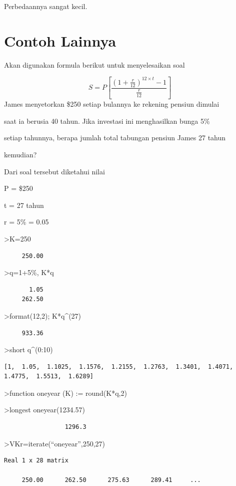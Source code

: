 \documentclass[
]{book}
\begin{document}
Perbedaannya sangat kecil.

\chapter{Contoh Lainnya}\label{contoh-lainnya-16}

Akan digunakan formula berikut untuk menyelesaikan soal

\[S = P [\frac {(1+ \frac {r}{12})^{12\times t}-1}{\frac{r}{12}}]\]James menyetorkan \$250 setiap bulannya ke rekening pensiun dimulai

saat ia berusia 40 tahun. Jika investasi ini menghasilkan bunga 5\%

setiap tahunnya, berapa jumlah total tabungan pensiun James 27 tahun

kemudian?

Dari soal tersebut diketahui nilai

P = \$250

t = 27 tahun

r = 5\% = 0.05

\textgreater K=250

\begin{verbatim}
     250.00 
\end{verbatim}

\textgreater q=1+5\%, K*q

\begin{verbatim}
       1.05 
     262.50 
\end{verbatim}

\textgreater format(12,2); K*q\^{}(27)

\begin{verbatim}
     933.36 
\end{verbatim}

\textgreater short q\^{}(0:10)

\begin{verbatim}
[1,  1.05,  1.1025,  1.1576,  1.2155,  1.2763,  1.3401,  1.4071,
1.4775,  1.5513,  1.6289]
\end{verbatim}

\textgreater function oneyear (K) := round(K*q,2)

\textgreater longest oneyear(1234.57)

\begin{verbatim}
                 1296.3 
\end{verbatim}

\textgreater VKr=iterate(``oneyear'',250,27)

\begin{verbatim}
Real 1 x 28 matrix

     250.00      262.50      275.63      289.41     ...
\end{verbatim}
\end{document}
